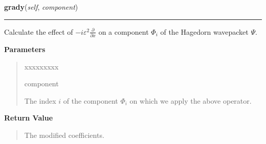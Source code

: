 \hspace{.8\funcindent}\begin{boxedminipage}{\funcwidth}

    \raggedright \textbf{grady}(\textit{self}, \textit{component})

    \vspace{-1.5ex}

    \rule{\textwidth}{0.5\fboxrule}
\setlength{\parskip}{2ex}
    Calculate the effect of $-i \varepsilon^2
    \frac{\partial}{\partial x}$ on a
    component $\Phi_i$ of the Hagedorn wavepacket
    $\Psi$.

\setlength{\parskip}{1ex}
      \textbf{Parameters}
      \vspace{-1ex}

      \begin{quote}
        \begin{Ventry}{xxxxxxxxx}

          \item[component]

          The index $i$ of the component $\Phi_i$ on
          which we apply the above operator.

        \end{Ventry}

      \end{quote}

      \textbf{Return Value}
    \vspace{-1ex}

      \begin{quote}
      The modified coefficients.

      \end{quote}

    \end{boxedminipage}

    \label{HagedornMultiWavepacket:HagedornMultiWavepacket:project_to_canonical}

    \vspace{0.5ex}

